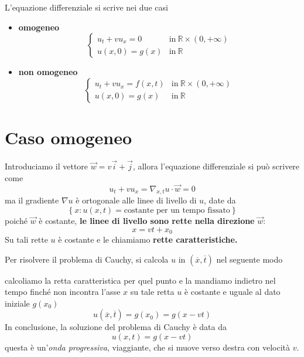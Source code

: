 \documentclass[10pt,a4paper,twoside,openright]{book}
\begin{document}
L'equazione differenziale si scrive nei due casi
\begin{itemize}
	\item \textbf{omogeneo}
	      \begin{equation*}
	      	\begin{cases}
	      		u_{t} +vu_{x} =0 & \text{in} \ \mathbb{R} \times ( 0,+\infty ) \\
	      		u( x,0) =g( x)   & \text{in} \ \mathbb{R}                      
	      	\end{cases}
	      \end{equation*}
	\item \textbf{non omogeneo}
	      \begin{equation*}
	      	\begin{cases}
	      		u_{t} +vu_{x} =f( x,t) & \text{in} \ \mathbb{R} \times ( 0,+\infty ) \\
	      		u( x,0) =g( x)         & \text{in} \ \mathbb{R}                      
	      	\end{cases}
	      \end{equation*}
\end{itemize}
\section{Caso omogeneo}

Introduciamo il vettore $\vec{w} =v\vec{i} +\vec{j}$, allora l'equazione differenziale si può scrivere come
\begin{equation*}
	u_{t} +vu_{x} =\nabla _{x,t} u\cdotp \vec{w} =0
\end{equation*}
ma il gradiente $\nabla u$ è ortogonale alle linee di livello di $u$, date da
\begin{equation*}
	\left\{x:u( x,t) =\text{costante per un tempo fissato}\right\}
\end{equation*}
poiché $\vec{w}$ è costante, \textbf{le linee di livello sono rette nella direzione} $\vec{w}$:
\begin{equation}
	x=vt+x_{0}
\end{equation}
Su tali rette $u$ è costante e le chiamiamo \textbf{rette caratteristiche.}

Per risolvere il problema di Cauchy, si calcola $u$ in $(\overline{x} ,\overline{t})$ nel seguente modo


calcoliamo la retta caratteristica per quel punto e la mandiamo indietro nel tempo finché non incontra l'asse $x$ su tale retta $u$ è costante e uguale al dato iniziale $g( x_{0})$
\begin{equation*}
	u(\overline{x} ,\overline{t}) =g( x_{0}) =g( x-vt)
\end{equation*}
In conclusione, la soluzione del problema di Cauchy è data da
\begin{equation}
	u( x,t) =g( x-vt)
\end{equation}
questa è un'\textit{onda progressiva}, viaggiante, che si muove verso destra con velocità $v$.
\end{document}
